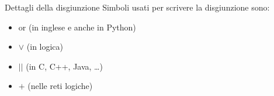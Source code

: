 \documentclass[aspectratio=169,10pt,dvipsnames,handout]{beamer}
\begin{document}
\begin{frame}{Dettagli della disgiunzione}
    Simboli usati per scrivere la disgiunzione sono:
    \begin{itemize}
        \item \alert{or (in inglese e anche in Python)}
        \item \alert{$\vee$ (in logica)}
        \item $\texttt{||}$ (in C, C++, Java, \ldots)
        \item $+$ (nelle reti logiche)
    \end{itemize}

\end{frame}
\end{document}

